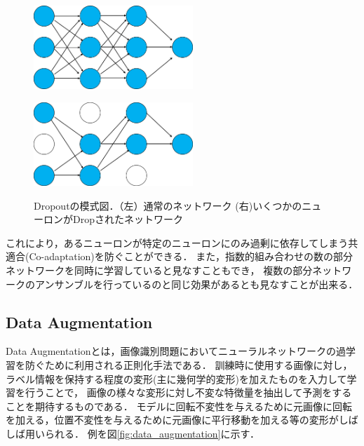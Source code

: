 \begin{figure}[tbp]
    \begin{minipage}{0.5\hsize}
     \begin{center}
      \includegraphics[width=60mm]{figures/standard_network.png}
     \end{center}
     \label{fig:one}
    \end{minipage}
    \begin{minipage}{0.5\hsize}
     \begin{center}
      \includegraphics[width=60mm]{figures/dropout_network.png}
     \end{center}
     \label{fig:two}
    \end{minipage}
    \caption{\label{fig:dropout_network}Dropoutの模式図．（左）通常のネットワーク (右)いくつかのニューロンがDropされたネットワーク}
    
\end{figure}

これにより，あるニューロンが特定のニューロンにのみ過剰に依存してしまう共適合(Co-adaptation)を防ぐことができる．
また，指数的組み合わせの数の部分ネットワークを同時に学習していると見なすこともでき，
複数の部分ネットワークのアンサンブルを行っているのと同じ効果があるとも見なすことが出来る．

\subsection{Data Augmentation}

Data Augmentationとは，画像識別問題においてニューラルネットワークの過学習を防ぐために利用される正則化手法である．
訓練時に使用する画像に対し，ラベル情報を保持する程度の変形(主に幾何学的変形)を加えたものを入力して学習を行うことで，
画像の様々な変形に対し不変な特徴量を抽出して予測をすることを期待するものである．
モデルに回転不変性を与えるために元画像に回転を加える，位置不変性を与えるために元画像に平行移動を加える等の変形がしばしば用いられる．
例を図\ref{fig:data_augmentation}に示す．

